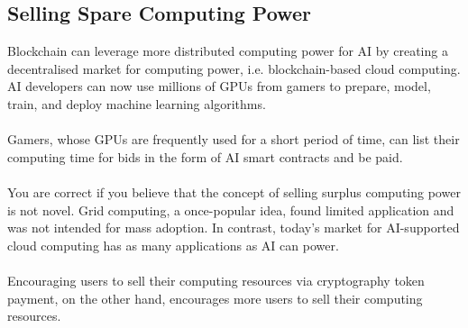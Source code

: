 \documentclass[12pt,letterpaper]{article}
\begin{document}
\pagebreak


    \subsection* {Selling Spare Computing Power}

    Blockchain can leverage more distributed computing power for AI by creating a decentralised market for computing power, i.e. blockchain-based cloud computing. AI developers can now use millions of GPUs from gamers to prepare, model, train, and deploy machine learning algorithms.
    \\
    \\
    Gamers, whose GPUs are frequently used for a short period of time, can list their computing time for bids in the form of AI smart contracts and be paid.
    \\
    \\
    You are correct if you believe that the concept of selling surplus computing power is not novel. Grid computing, a once-popular idea, found limited application and was not intended for mass adoption. In contrast, today's market for AI-supported cloud computing has as many applications as AI can power. 
    \\
    \\
    Encouraging users to sell their computing resources via cryptography token payment, on the other hand, encourages more users to sell their computing resources.


    
  
\end{document}
